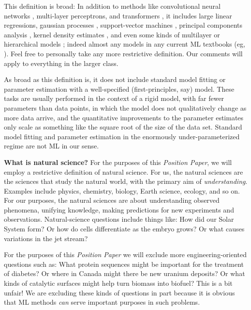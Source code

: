 \documentclass{article}
\newcommand{\documentname}{\textsl{Position Paper}}
\renewcommand{\paragraph}[1]{\noindent\par\textbf{#1}}
\begin{document}
This definition is broad:
In addition to methods like convolutional neural networks \cite{cnn}, multi-layer perceptrons, and transformers \cite{transformer}, it includes large linear regressions, gaussian processes \cite{gp}, support-vector machines \cite{svm}, principal components analysis \cite{pca}, kernel density estimates \cite{kde}, and even some kinds of multilayer or hierarchical models \cite{multilevel}; indeed almost any models in any current ML textbooks (eg, \citealt{ml_book1, ml_book2}).
Feel free to personally take any more restrictive definition.
Our comments will apply to everything in the larger class.

As broad as this definition is, it does not include standard model fitting or parameter estimation with a well-specified (first-principles, say) model.
These tasks are usually performed in the context of a rigid model, with far fewer parameters than data points, in which the model does not qualitatively change as more data arrive, and the quantitative improvements to the parameter estimates only scale as something like the square root of the size of the data set.
Standard model fitting and parameter estimation in the enormously under-parameterized regime are not ML in our sense.

\paragraph{What is natural science?}
For the purposes of this \documentname, we will employ a restrictive definition of natural science.
For us, the natural sciences are the sciences that study the natural world, with the primary aim of \emph{understanding}.
Examples include physics, chemistry, biology, Earth science, ecology, and so on.
For our purposes, the natural sciences are about understanding observed phenomena, unifying knowledge, making predictions for new experiments and observations.
Natural-science questions include things like:
How did our Solar System form?
Or how do cells differentiate as the embryo grows?
Or what causes variations in the jet stream?

For the purposes of this \documentname{} we will exclude more engineering-oriented questions such as: What protein sequences might be important for the treatment of diabetes? Or where in Canada might there be new uranium deposits? Or what kinds of catalytic surfaces might help turn biomass into biofuel?
This is a bit unfair!
We are excluding these kinds of questions in part because it is obvious that ML methods \emph{can} serve important purposes in such problems.
\end{document}
